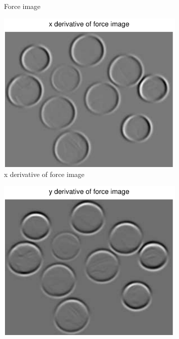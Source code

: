 \documentclass[11pt,a4paper]{article}
\begin{document}
\begin{figure}[H]
\begin{subfigure}[t]{0.24\textwidth}
        \caption{Force image}
        \label{fig:coins_forces}
    \end{subfigure}
    \begin{subfigure}[t]{0.24\textwidth}
        \includegraphics[width=\textwidth]{src/images/coins_gradient_xforces.pdf}
        \caption{x derivative of force image}
        \label{fig:coins_fx}
    \end{subfigure}
    \begin{subfigure}[t]{0.24\textwidth}
        \includegraphics[width=\textwidth]{src/images/coins_gradient_yforces.pdf}

\end{subfigure}
\end{figure}
\end{document}
